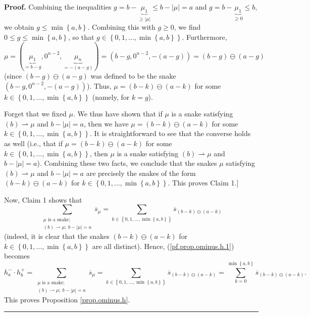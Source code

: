 \documentclass[numbers=enddot,12pt,final,onecolumn,notitlepage]{scrartcl}%
\theoremstyle{definition}
\newenvironment{proof}[1][Proof]{\noindent\textbf{#1.} }{\ \rule{0.5em}{0.5em}}
\let\sumnonlimits\sum
\renewcommand{\sum}{\sumnonlimits\limits}
\newenvironment{verlong}{}{}
\begin{document}
\begin{proof}
\begin{verlong}
Combining the inequalities $g=b-\underbrace{\mu_{1}}_{\geq\left\vert
\mu\right\vert }\leq b-\left\vert \mu\right\vert =a$ and $g=b-\underbrace{\mu
_{1}}_{\geq0}\leq b$, we obtain $g\leq\min\left\{  a,b\right\}  $. Combining
this with $g\geq0$, we find $0\leq g\leq\min\left\{  a,b\right\}  $, so that
$g\in\left\{  0,1,\ldots,\min\left\{  a,b\right\}  \right\}  $. Furthermore,%
\[
\mu=\left(  \underbrace{\mu_{1}}_{=b-g},0^{n-2},\underbrace{\mu_{n}%
}_{=-\left(  a-g\right)  }\right)  =\left(  b-g,0^{n-2},-\left(  a-g\right)
\right)  =\left(  b-g\right)  \ominus\left(  a-g\right)
\]
(since $\left(  b-g\right)  \ominus\left(  a-g\right)  $ was defined to be the
snake $\left(  b-g,0^{n-2},-\left(  a-g\right)  \right)  $). Thus,
$\mu=\left(  b-k\right)  \ominus\left(  a-k\right)  $ for some $k\in\left\{
0,1,\ldots,\min\left\{  a,b\right\}  \right\}  $ (namely, for $k=g$).

Forget that we fixed $\mu$. We thus have shown that if $\mu$ is a snake
satisfying $\left(  b\right)  \rightharpoonup\mu$ and $b-\left\vert
\mu\right\vert =a$, then we have $\mu=\left(  b-k\right)  \ominus\left(
a-k\right)  $ for some $k\in\left\{  0,1,\ldots,\min\left\{  a,b\right\}
\right\}  $. It is straightforward to see that the converse holds as well
(i.e., that if $\mu=\left(  b-k\right)  \ominus\left(  a-k\right)  $ for some
$k\in\left\{  0,1,\ldots,\min\left\{  a,b\right\}  \right\}  $, then $\mu$ is
a snake satisfying $\left(  b\right)  \rightharpoonup\mu$ and $b-\left\vert
\mu\right\vert =a$). Combining these two facts, we conclude that the snakes
$\mu$ satisfying $\left(  b\right)  \rightharpoonup\mu$ and $b-\left\vert
\mu\right\vert =a$ are precisely the snakes of the form $\left(  b-k\right)
\ominus\left(  a-k\right)  $ for $k\in\left\{  0,1,\ldots,\min\left\{
a,b\right\}  \right\}  $. This proves Claim 1.]
\end{verlong}

Now, Claim 1 shows that%
\[
\sum_{\substack{\mu\text{ is a snake;}\\\left(  b\right)  \rightharpoonup
\mu;\ b-\left\vert \mu\right\vert =a}}\overline{s}_{\mu}=\sum_{k\in\left\{
0,1,\ldots,\min\left\{  a,b\right\}  \right\}  }\overline{s}_{\left(
b-k\right)  \ominus\left(  a-k\right)  }%
\]
(indeed, it is clear that the snakes $\left(  b-k\right)  \ominus\left(
a-k\right)  $ for $k\in\left\{  0,1,\ldots,\min\left\{  a,b\right\}  \right\}
$ are all distinct). Hence, (\ref{pf.prop.ominus.h.1}) becomes%
\[
h_{a}^{-}\cdot h_{b}^{+}=\sum_{\substack{\mu\text{ is a snake;}\\\left(
b\right)  \rightharpoonup\mu;\ b-\left\vert \mu\right\vert =a}}\overline
{s}_{\mu}=\sum_{k\in\left\{  0,1,\ldots,\min\left\{  a,b\right\}  \right\}
}\overline{s}_{\left(  b-k\right)  \ominus\left(  a-k\right)  }=\sum
_{k=0}^{\min\left\{  a,b\right\}  }\overline{s}_{\left(  b-k\right)
\ominus\left(  a-k\right)  }.
\]
This proves Proposition \ref{prop.ominus.h}.
\end{proof}
\end{document}
